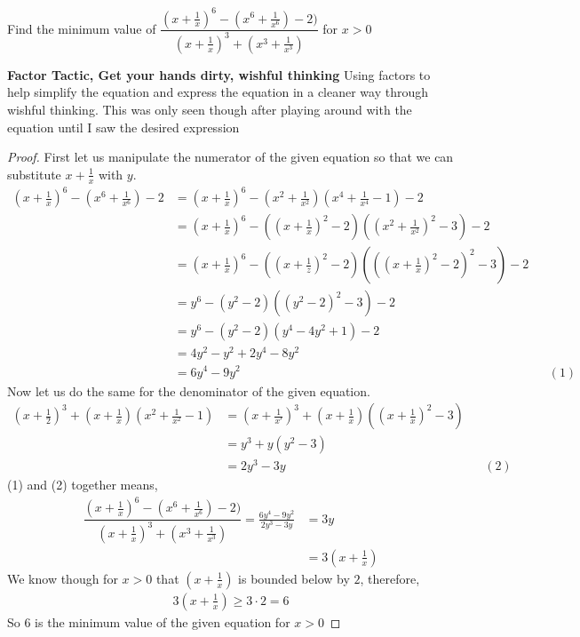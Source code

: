 \documentclass[11pt]{article}
\newenvironment{problem}[2][Problem\!]{\begin{trivlist}
\item[\hskip \labelsep {\bfseries #1}\hskip \labelsep {\bfseries #2}]}{\end{trivlist}}
\renewcommand{\geq}{\geqslant}
\begin{document}
\begin{tcolorbox}
    \begin{problem} {IC | 12/03 | PP 41.}
        Find the minimum value of $\dfrac{(x+\frac{1}{x})^{6} - (x^{6}+\frac{1}{x^{6}}) -2)}{(x+\frac{1}{x})^{3} + (x^{3} + \frac{1}{x^{3}})}$ for $x > 0$
    \end{problem}
    \textbf{Factor Tactic, Get your hands dirty, wishful thinking} Using factors to help simplify the equation and express the equation in a cleaner way through wishful thinking. This was only seen though after playing around with the equation until I saw the desired expression 
\end{tcolorbox}
\begin{proof}
    First let us manipulate the numerator of the given equation so that we can substitute $x + \frac{1}{x}$ with $y$.
    \begin{align*}
        (x+\frac{1}{x})^{6} - (x^{6} + \frac{1}{x^{6}}) -2 &= (x+ \frac{1}{x})^{6} - (x^{2} + \frac{1}{x^{2}})(x^{4} + \frac{1}{x^{4}} - 1) - 2 \\
        &= (x + \frac{1}{x})^{6} - ((x + \frac{1}{x})^{2}-2)((x^{2} + \frac{1}{x^{2}})^{2} - 3) - 2 \\
        &= (x + \frac{1}{x})^{6} - ((x + \frac{1}{z})^{2} - 2)(((x + \frac{1}{x})^{2} - 2)^{2} -3) - 2 \\
        &= y^{6} - (y^{2} - 2)((y^{2}-2)^{2} - 3) - 2 \\
        &= y^{6} - (y^{2} - 2)(y^{4}-4y^{2} + 1) -2 \\
        &= 4y^{2} - y^{2} + 2y^{4} -8y^{2} \\
        &= 6y^{4} - 9y^{2} && (1)
    \end{align*}
    Now let us do the same for the denominator of the given equation.
    \begin{align*}
        (x + \frac{1}{2})^{3} + (x + \frac{1}{x})(x^{2} + \frac{1}{x^{2}} -1) &= (x + \frac{1}{x'})^{3} + (x + \frac{1}{x})((x + \frac{1}{x})^{2} - 3) \\
        &= y^{3} + y(y^{2} - 3) \\
        &= 2y^{3} - 3y && (2)
    \end{align*}
    (1) and (2) together means,
    \begin{align*}
        \dfrac{(x+\frac{1}{x})^{6} - (x^{6}+\frac{1}{x^{6}}) -2)}{(x+\frac{1}{x})^{3} + (x^{3} + \frac{1}{x^{3}})} = \frac{6y^{4} - 9y^{2}}{2y^{3} - 3y} &= 3y \\ 
        &= 3(x + \frac{1}{x})
    \end{align*}
    We know though for $x > 0$ that $(x + \frac{1}{x})$ is bounded below by $2$, therefore,
    \begin{align*}
        3(x + \frac{1}{x}) \geq 3\cdot 2 = 6
    \end{align*}
    So $6$ is the minimum value of the given equation for $x> 0$
\end{proof}
\end{document}
